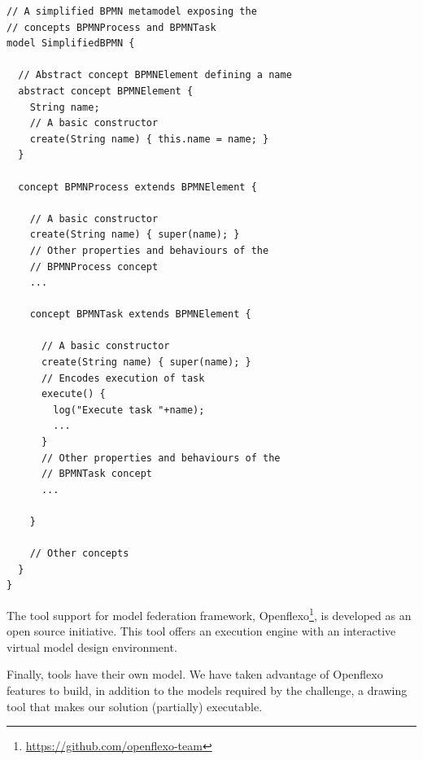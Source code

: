 \begin{lstlisting}
// A simplified BPMN metamodel exposing the
// concepts BPMNProcess and BPMNTask
model SimplifiedBPMN {

  // Abstract concept BPMNElement defining a name
  abstract concept BPMNElement {
    String name;
    // A basic constructor
    create(String name) { this.name = name; }
  }

  concept BPMNProcess extends BPMNElement {

    // A basic constructor
    create(String name) { super(name); }
    // Other properties and behaviours of the
    // BPMNProcess concept
    ...

    concept BPMNTask extends BPMNElement {

      // A basic constructor
      create(String name) { super(name); }
      // Encodes execution of task
      execute() {
        log("Execute task "+name);
        ...
      }
      // Other properties and behaviours of the
      // BPMNTask concept
      ...

    }

    // Other concepts
  }
}
\end{lstlisting}


The tool support for model federation framework,
Openflexo\footnote{\url{https://github.com/openflexo-team}}, is
developed as an open source initiative. This tool offers an \FML
execution engine with an interactive virtual model design environment.

Finally, tools have their own model. We have taken advantage of Openflexo
features to build, in addition to the models  required by the challenge, a
drawing tool that makes our solution (partially) executable.

